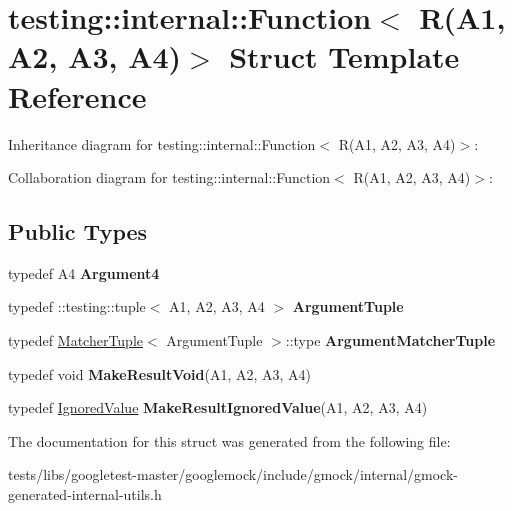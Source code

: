 \hypertarget{structtesting_1_1internal_1_1Function_3_01R_07A1_00_01A2_00_01A3_00_01A4_08_4}{}\section{testing\+:\+:internal\+:\+:Function$<$ R(A1, A2, A3, A4)$>$ Struct Template Reference}
\label{structtesting_1_1internal_1_1Function_3_01R_07A1_00_01A2_00_01A3_00_01A4_08_4}


Inheritance diagram for testing\+:\+:internal\+:\+:Function$<$ R(A1, A2, A3, A4)$>$\+:


Collaboration diagram for testing\+:\+:internal\+:\+:Function$<$ R(A1, A2, A3, A4)$>$\+:
\subsection*{Public Types}
\begin{DoxyCompactItemize}
\item 
\mbox{\label{structtesting_1_1internal_1_1Function_3_01R_07A1_00_01A2_00_01A3_00_01A4_08_4_ae5039423598ab0fecd4f594acbf34d85}} 
typedef A4 {\bfseries Argument4}
\item 
\mbox{\label{structtesting_1_1internal_1_1Function_3_01R_07A1_00_01A2_00_01A3_00_01A4_08_4_a8ad9e0ae57a766f80a9816ad45626812}} 
typedef \+::testing\+::tuple$<$ A1, A2, A3, A4 $>$ {\bfseries Argument\+Tuple}
\item 
\mbox{\label{structtesting_1_1internal_1_1Function_3_01R_07A1_00_01A2_00_01A3_00_01A4_08_4_a9524b18868ab632a90d4cb6917057a14}} 
typedef \hyperlink{structtesting_1_1internal_1_1MatcherTuple}{Matcher\+Tuple}$<$ Argument\+Tuple $>$\+::type {\bfseries Argument\+Matcher\+Tuple}
\item 
\mbox{\label{structtesting_1_1internal_1_1Function_3_01R_07A1_00_01A2_00_01A3_00_01A4_08_4_af7462da27e87a9d580e7f9748ebc5754}} 
typedef void {\bfseries Make\+Result\+Void}(A1, A2, A3, A4)
\item 
\mbox{\label{structtesting_1_1internal_1_1Function_3_01R_07A1_00_01A2_00_01A3_00_01A4_08_4_a6736086d1c8ba25788add1e5180207f9}} 
typedef \hyperlink{classtesting_1_1internal_1_1IgnoredValue}{Ignored\+Value} {\bfseries Make\+Result\+Ignored\+Value}(A1, A2, A3, A4)
\end{DoxyCompactItemize}


The documentation for this struct was generated from the following file\+:\begin{DoxyCompactItemize}
\item 
tests/libs/googletest-\/master/googlemock/include/gmock/internal/gmock-\/generated-\/internal-\/utils.\+h\end{DoxyCompactItemize}
